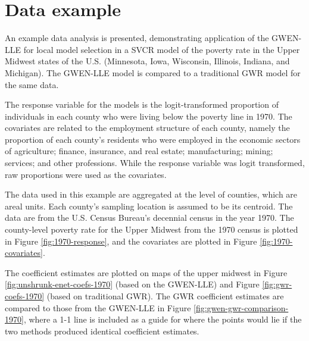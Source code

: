 \documentclass[authoryear, review, 11pt]{elsarticle}
\begin{document}
%
%
%
%			
%

			
\section{Data example\label{section:data-analysis}}
    An example data analysis is presented, demonstrating application of the GWEN-LLE for local model selection in a SVCR model of the poverty rate in the Upper Midwest states of the U.S. (Minnesota, Iowa, Wisconsin, Illinois, Indiana, and Michigan). The GWEN-LLE model is compared to a traditional GWR model for the same data.

    The response variable for the models is the logit-transformed proportion of individuals in each county who were living below the poverty line in 1970. The covariates are related to the employment structure of each county, namely the proportion of each county's residents who were employed in the economic sectors of agriculture; finance, insurance, and real estate; manufacturing; mining; services; and other professions. While the response variable was logit transformed, raw proportions were used as the covariates.

The data used in this example are aggregated at the level of counties, which are areal units. Each county's sampling location is assumed to be its centroid. The data are from the U.S. Census Bureau's decennial census in the year 1970. The county-level poverty rate for the Upper Midwest from the 1970 census is plotted in Figure \ref{fig:1970-response}, and the covariates are plotted in Figure \ref{fig:1970-covariates}.
	
The coefficient estimates are plotted on maps of the upper midwest in Figure \ref{fig:unshrunk-enet-coefs-1970} (based on the GWEN-LLE) and Figure \ref{fig:gwr-coefs-1970} (based on traditional GWR). The GWR coefficient estimates are compared to those from the GWEN-LLE in Figure \ref{fig:gwen-gwr-comparison-1970}, where a 1-1 line is included as a guide for where the points would lie if the two methods produced identical coefficient estimates.
\end{document}
